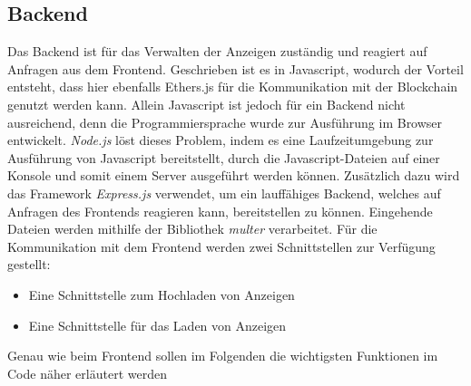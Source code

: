 \subsection{Backend}
Das Backend ist für das Verwalten der Anzeigen zuständig und reagiert auf Anfragen aus dem Frontend. Geschrieben ist es in Javascript, wodurch der Vorteil entsteht, dass hier ebenfalls Ethers.js für die Kommunikation mit der Blockchain genutzt werden kann. 
Allein Javascript ist jedoch für ein Backend nicht ausreichend, denn die Programmiersprache wurde zur Ausführung im Browser entwickelt. \emph{Node.js} löst dieses Problem, indem es eine Laufzeitumgebung zur Ausführung von Javascript bereitstellt, durch die Javascript-Dateien auf einer Konsole und somit einem Server ausgeführt werden können. Zusätzlich dazu wird das Framework \emph{Express.js} verwendet, um ein lauffähiges Backend, welches auf Anfragen des Frontends reagieren kann, bereitstellen zu können. Eingehende Dateien werden mithilfe der Bibliothek \emph{multer} verarbeitet.
Für die Kommunikation mit dem Frontend werden zwei Schnittstellen zur Verfügung gestellt: 
\begin{itemize}
	\item Eine Schnittstelle zum Hochladen von Anzeigen
	\item Eine Schnittstelle für das Laden von Anzeigen
\end{itemize}
Genau wie beim Frontend sollen im Folgenden die wichtigsten Funktionen im Code näher erläutert werden

